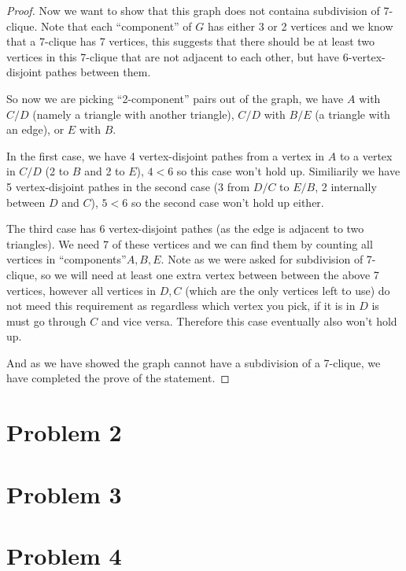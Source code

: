\documentclass[11pt]{article}
\begin{document}
\begin{proof}
Now we want to show that this graph does not containa subdivision of 7-clique. Note that each ``component'' of $G$ has either 3 or 2 vertices and we know that a 7-clique has 7 vertices, this suggests that there should be at least two vertices in this 7-clique that are not adjacent to each other, but have 6-vertex-disjoint pathes between them.\newline

So now we are picking ``2-component'' pairs out of the graph, we have $A$ with $C/D$ (namely a triangle with another triangle), $C/D$ with $B/E$ (a triangle with an edge), or $E$ with $B$.

In the first case, we have 4 vertex-disjoint pathes from a vertex in $A$ to a vertex in $C/D$ (2 to $B$ and 2 to $E$), $4 < 6$ so this case won't hold up. Similiarily we have 5 vertex-disjoint pathes in the second case (3 from $D/C$ to $E/B$, 2 internally between $D$ and $C$), $5 < 6$ so the second case won't hold up either.

The third case has 6 vertex-disjoint pathes (as the edge is adjacent to two triangles). We need 7 of these vertices and we can find them by counting all vertices in ``components''$A, B, E$. Note as we were asked for subdivision of 7-clique, so we will need at least one extra vertex between between the above 7 vertices, however all vertices in $D, C$ (which are the only vertices left to use) do not meed this requirement as regardless which vertex you pick, if it is in $D$ is must go through $C$ and vice versa. Therefore this case eventually also won't hold up. \newline

And as we have showed the graph cannot have a subdivision of a 7-clique, we have completed the prove of the statement.

\end{proof}

\section*{Problem 2}

\section*{Problem 3}

\section*{Problem 4}



%
% 
% 
\end{document}
